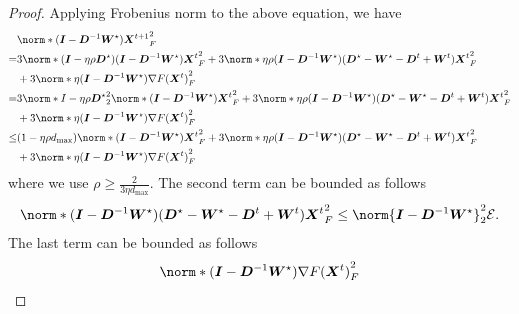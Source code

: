 \documentclass{article}
\begin{document}
\begin{proof}
Applying Frobenius norm to the above equation, we have 
\begin{align*}
  &\norm*{(\mI - \mD^{-1}\mW^\star) \mX^{t+1}}_F^2 \\
  =& 3\norm*{(\mI - \eta\rho \mD^\star ) (\mI - \mD^{-1}\mW^\star) \mX^t}_F^2
   + 3\norm*{\eta\rho(\mI - \mD^{-1}\mW^\star)(\mD^\star - \mW^\star - \mD^t + \mW^t) \mX^t}_F^2 \\
    & + 3\norm*{\eta(\mI - \mD^{-1}\mW^\star) \nabla F(\mX^t)}_F^2\\
  =& 3\norm*{I - \eta\rho \mD^\star }_2^2  \norm*{(\mI - \mD^{-1}\mW^\star) \mX^{t}}_F^2
  + 3\norm*{\eta\rho(\mI - \mD^{-1}\mW^\star)(\mD^\star - \mW^\star - \mD^t + \mW^t) \mX^t}_F^2 \\
  & + 3\norm*{\eta(\mI - \mD^{-1}\mW^\star) \nabla F(\mX^t)}_F^2\\ 
  \le& (1-\eta\rho d_\text{max})  \norm*{(\mI - \mD^{-1}\mW^\star) \mX^{t}}_F^2
  + 3\norm*{\eta\rho(\mI - \mD^{-1}\mW^\star)(\mD^\star - \mW^\star - \mD^t + \mW^t) \mX^t}_F^2 \\
  & + 3\norm*{\eta(\mI - \mD^{-1}\mW^\star) \nabla F(\mX^t)}_F^2
\end{align*}
where we use $\rho\ge \frac{2}{3\eta d_\text{max}}$. The second term can be bounded as follows
\begin{align*}
  \norm*{(\mI - \mD^{-1}\mW^\star)(\mD^\star - \mW^\star - \mD^t + \mW^t) \mX^t}_F^2 \le \norm{\mI - \mD^{-1}\mW^\star}_2^2 \cE.
\end{align*}
The last term can be bounded as follows
\begin{align*}
  \norm*{(\mI - \mD^{-1}\mW^\star) \nabla F(\mX^t)}_F^2
\end{align*}
\end{proof}


\newpage
\appendix
\end{document}
